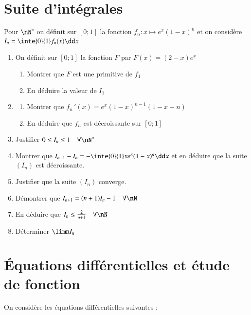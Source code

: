 \documentclass[oneside,12pt]{article}
\let\oldsection\section
\renewcommand{\section}{\newpage\oldsection}
\begin{document}
\section{Suite d'intégrales}

Pour $\nN^*$ on définit sur $[0;1]$ la fonction $f_n:x\mapsto e^x(1-x)^n$ et on considère $I_n=\inte{0}{1}f_n(x)\dd x$
\begin{enumerate}
    \item On définit sur $[0;1]$ la fonction $F$ par $F(x)=(2-x)e^x$
    \begin{enumerate}
        \item Montrer que $F$ est une primitive de $f_1$
        \item En déduire la valeur de $I_1$
    \end{enumerate}
    \item \begin{enumerate}
        \item Montrer que $f_n\,'(x)=e^x(1-x)^{n-1}(1-x-n)$
        \item En déduire que $f_n$ est décroissante sur $[0;1]$
    \end{enumerate}
    \item Justifier $0\leq I_n\leq1\quad\forall\nN^*$
    \item Montrer que $I_{n+1}-I_n=-\inte{0}{1}xe^x(1-x)^n\dd x$ \quad et en déduire que la suite $(I_n)$ est décroissante.
    \item Justifier que la suite $(I_n)$ converge.
    \item Démontrer que $I_{n+1}=(n+1)I_n-1\quad\forall\nN$
    \item En déduire que $I_n\leq\frac{2}{n+1}\quad\forall\nN$
    \item Déterminer $\limn I_n$
\end{enumerate}





\section{Équations différentielles et étude de fonction}

On considère les équations différentielles suivantes :
\end{document}
